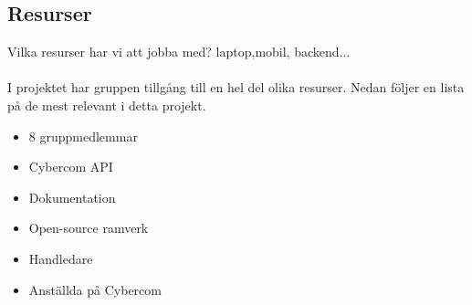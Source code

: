 \subsection{Resurser}
Vilka resurser har vi att jobba med?
laptop,mobil, backend...\\
\\
I projektet har gruppen tillgång till en hel del olika resurser. Nedan följer en lista på de mest relevant i detta projekt.\\
\begin{itemize}
\item 8 gruppmedlemmar
\item Cybercom API
\item Dokumentation
\item Open-source ramverk
\item Handledare
\item Anställda på Cybercom
\end{itemize}
